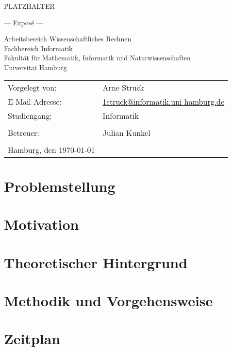 \documentclass[
	12pt,
	a4paper,
	BCOR10mm,
	DIV14,
	listof=totoc,
	bibliography=totoc,
	headsepline
]{scrreprt}
\begin{document}
\begin{titlepage}
	\begin{center}
		{\titlefont\huge PLATZHALTER \par}

		\bigskip
		\bigskip

		{\titlefont\Large --- Exposé ---\par}

		\bigskip
		\bigskip

		{\large Arbeitsbereich Wissenschaftliches Rechnen\\
		Fachbereich Informatik\\
		Fakultät für Mathematik, Informatik und Naturwissenschaften\\
		Universität Hamburg\par}
	\end{center}

	\vfill

	{\large \begin{tabular}{ll}
		Vorgelegt von: & Arne Struck \\
		E-Mail-Adresse: 
			& \href{mailto:1struck@informatik.uni-hamburg.de}{1struck@informatik.uni-hamburg.de} \\ 
		Studiengang: & Informatik \\
		\\
		Betreuer: & Julian Kunkel \\
		\\
		Hamburg, den \today
	\end{tabular}\par}
\end{titlepage}

\thispagestyle{empty}

   
\tableofcontents

\chapter{Problemstellung}
\label{Problemstellung}

\chapter{Motivation}
\label{Motivation}


\chapter{Theoretischer Hintergrund}
\label{Theoretischer Hintergrund}

\chapter{Methodik und Vorgehensweise}
\label{Methodik und Vorgehensweise}

\chapter{Zeitplan}
\label{Zeitplan}





\nocite{*}




\end{document}
